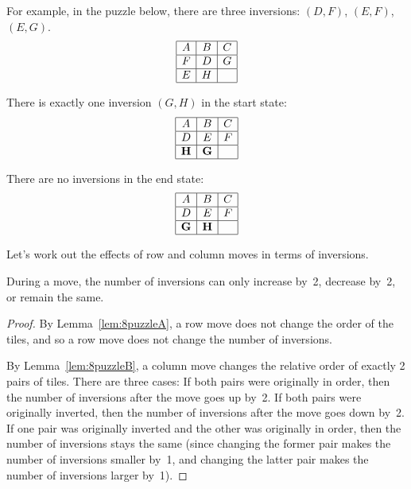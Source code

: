 For example, in the puzzle below, there are three inversions: $(D,
F)$, $(E, F)$, $(E, G)$.
\begin{equation*}
\begin{array}{|c|c|c|}
\hline
A & B & C \\ \hline
F & D & G \\ \hline
E & H &   \\ \hline
\end{array}
\end{equation*}

There is exactly one inversion $(G, H)$ in the start state:
\begin{equation*}
\begin{array}{|c|c|c|}
\hline
A & B & C \\ \hline
D & E & F \\ \hline
\mathbf{H} & \mathbf{G} &   \\ \hline
\end{array}
\end{equation*}

There are no inversions in the end state:
\begin{equation*}
\begin{array}{|c|c|c|}
\hline
A & B & C \\ \hline
D & E & F \\ \hline
\mathbf{G} & \mathbf{H} &   \\ \hline
\end{array}
\end{equation*}

Let's work out the effects of row and column moves in terms of
inversions.

\begin{lemma}\label{lem:8puzzleC}
During a move, the number of inversions can only increase by~2,
decrease by~2, or remain the same.
\end{lemma}

\begin{proof}
By Lemma~\ref{lem:8puzzleA}, a row move does not change the order of
the tiles, and so a row move does not change the number
of inversions.

By Lemma~\ref{lem:8puzzleB}, a column move changes the relative order
of exactly 2 pairs of tiles.  There are three cases: If both pairs
were originally in order, then the number of inversions after the move
goes up by~2.  If both pairs were originally inverted, then the number
of inversions after the move goes down by~2.  If one pair was
originally inverted and the other was originally in order, then the
number of inversions stays the same (since changing the former pair
makes the number of inversions smaller by~1, and changing the latter
pair makes the number of inversions larger by~1).
\end{proof}

